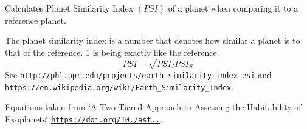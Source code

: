 Calculates Planet Similarity Index $(PSI)$ of a planet when comparing it to a reference planet. 

The planet similarity index is a number that denotes how similar a planet is to that of the reference. 1 is being exactly like the reference. \[PSI=\sqrt{PSI_I PSI_S}\] See \href{http://phl.upr.edu/projects/earth-similarity-index-esi}{\tt http\+://phl.\+upr.\+edu/projects/earth-\/similarity-\/index-\/esi} and \href{https://en.wikipedia.org/wiki/Earth_Similarity_Index}{\tt https\+://en.\+wikipedia.\+org/wiki/\+Earth\+\_\+\+Similarity\+\_\+\+Index}.

Equations taken from \char`\"{}\+A Two-\/\+Tiered Approach to Assessing the Habitability of Exoplanets\char`\"{} \href{https://doi.org/10.1089/ast.2010.0592}{\tt https\+://doi.\+org/10./ast..}.


